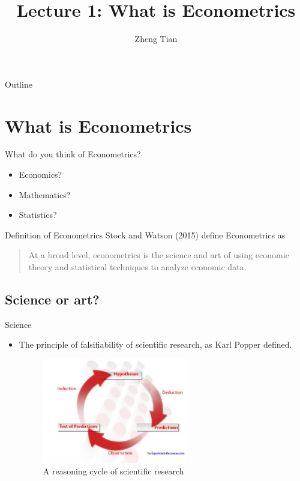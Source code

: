 \documentclass[presentation]{beamer}
\author{Zheng Tian}
\date{}
\title{Lecture 1: What is Econometrics}
\begin{document}
\maketitle
\begin{frame}{Outline}
\setcounter{tocdepth}{1}
\tableofcontents
\end{frame}



\section{What is Econometrics}
\label{sec:org7253b79}
\setcounter{tocdepth}{1}
\tableofcontents[currentsection]

\begin{frame}[label={sec:org3f837f0}]{What do you think of Econometrics?}
\begin{itemize}
\item Economics?
\item Mathematics?
\item Statistics?
\end{itemize}
\end{frame}


\begin{frame}[label={sec:orgee0e4bc}]{Definition of Econometrics}
Stock and Watson (2015) define Econometrics as

\begin{quote}
At a broad level, econometrics is the science and art of using
economic theory and statistical techniques to analyze economic
data.
\end{quote}
\end{frame}


\subsection*{Science or art?}
\label{sec:org774530d}

\begin{frame}[label={sec:org269f823}]{Science}
\begin{itemize}
\item The principle of \alert{falsifiability} of scientific research, as Karl Popper
defined.

\begin{figure}[htbp]
\centering
\includegraphics[width=0.6\textwidth]{figure/reasoning-cycle-research.jpg}
\caption{A reasoning cycle of scientific research}
\end{figure}
\end{itemize}
\end{frame}
\end{document}
